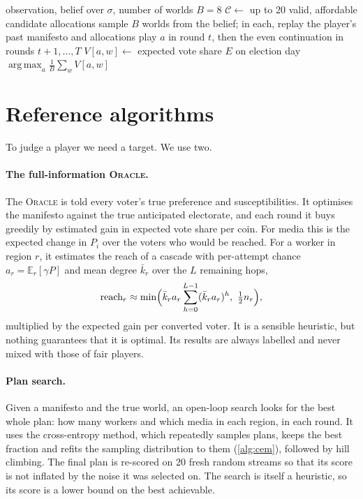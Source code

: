 \documentclass[11pt,a4paper,oneside]{report}
\newcommand{\E}{\mathbb{E}}
\newcommand{\ORACLE}{\textsc{Oracle}}
\DeclareMathOperator*{\argmax}{arg\,max}
\begin{document}
\begin{algorithm}[t]
\caption{Rollout planning for round $t$}\label{alg:rollout}
\begin{algorithmic}[1]
\Require observation, belief over $\sigma$, number of worlds $B = 8$
\State $\mathcal C \gets$ up to 20 valid, affordable candidate allocations
\State sample $B$ worlds from the belief; in each, replay the player's past manifesto and allocations
  \State play $a$ in round $t$, then the even continuation in rounds $t+1,\dots,T$
  \State $V[a,w] \gets$ expected vote share $E$ on election day
\EndFor
\State \Return $\argmax_{a} \frac1B \sum_w V[a,w]$
\end{algorithmic}
\end{algorithm}

\section{Reference algorithms}

To judge a player we need a target. We use two.

\paragraph{The full-information \ORACLE.} The \ORACLE{} is told every voter's true preference and
susceptibilities. It optimises the manifesto against the true anticipated electorate, and each round it
buys greedily by estimated gain in expected vote share per coin. For media this is the expected change in
$P_i$ over the voters who would be reached. For a worker in region $r$, it estimates the reach of a
cascade with per-attempt chance $a_r = \E_r[\gamma P]$ and mean degree $\bar k_r$ over the $L$ remaining
hops,
\begin{equation}
  \text{reach}_r \approx \min\Bigl(\bar k_r a_r \sum_{h=0}^{L-1} (\bar k_r a_r)^h,\ \tfrac12 n_r\Bigr),
\end{equation}
multiplied by the expected gain per converted voter. It is a sensible heuristic, but nothing guarantees
that it is optimal. Its results are always labelled and never mixed with those of fair players.

\paragraph{Plan search.} Given a manifesto and the true world, an open-loop search looks for the best
whole plan: how many workers and which media in each region, in each round. It uses the cross-entropy
method, which repeatedly samples plans, keeps the best fraction and refits the
sampling distribution to them (\cref{alg:cem}), followed by hill climbing. The final plan is re-scored on
20 fresh random streams so that its score is not inflated by the noise it was selected on. The search is
itself a heuristic, so its score is a lower bound on the best achievable.
\end{document}
